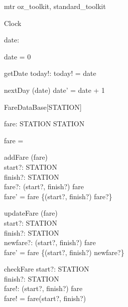 \documentclass[11pt]{article}
\begin{document}
\begin{zsection}
  \SECTION mtr \parents oz\_toolkit, standard\_toolkit
\end{zsection}

\zedsize{\small}
\begin{class}{Clock}
\also
\begin{state}
date:  \nat
\end{state}\classbreak
\begin{init}
date = 0
\end{init}\classbreak
\begin{op}{getDate}
today!:  \nat  
\where
today! = date
\end{op}\classbreak
\begin{op}{nextDay}
\Delta (date)
\where
date' = date + 1
\end{op} 
\end{class} 

\begin{class}{FareDataBase[STATION]}
\also
\begin{state}
fare: STATION \cross STATION \pfun  \nat  
\end{state} \classbreak
\begin{init}
fare = \emptyset
\end{init} \classbreak
\begin{op}{addFare}
\Delta (fare)\\
start?: STATION \\ 
finish?: STATION \\ 
fare?:  \nat  
\where
(start?, finish?) \notin  \dom fare \\ 
fare' = fare \cup \{(start?, finish?) \mapsto fare?\} \\ 
\end{op} \classbreak
\begin{op}{updateFare}
\Delta (fare)\\
start?: STATION \\ 
finish?: STATION \\ 
newfare?:  \nat  
\where
 (start?, finish?) \in  \dom fare \\ 
fare' = fare \oplus \{(start?, finish?) \mapsto newfare?\} \\ 
\end{op} \classbreak 
\begin{op}{checkFare}
start?: STATION \\ 
finish?: STATION \\ 
fare!:  \nat  
\where
 (start?, finish?) \in  \dom fare \\ 
fare! = fare(start?, finish?)
\end{op} 
\end{class} 
\end{document}
